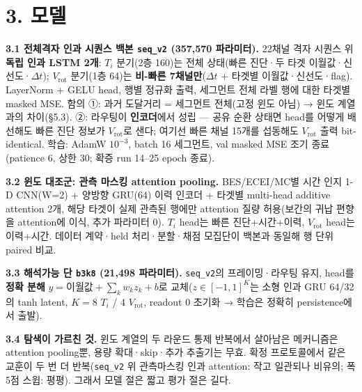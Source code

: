 \documentclass[10pt,a4paper]{article}
\newcommand{\Ti}{\ensuremath{T_i}}
\newcommand{\Vrot}{\ensuremath{V_\mathrm{rot}}}
\newcommand{\seqv}{\texttt{seq\_v2}}
\newcommand{\bthree}{\texttt{b3k8}}
\begin{document}
\section*{3. 모델}
\textbf{3.1 전체격자 인과 시퀀스 백본 \seqv{} (357,570 파라미터).} 22채널 격자 시퀀스 위 \textbf{독립 인과 LSTM 2개}: \Ti{} 분기(2층 160)는 전체 상태(빠른 진단·두 타겟 이월값·신선도·$\Delta t$); \Vrot{} 분기(1층 64)는 \textbf{비-빠른 7채널만}($\Delta t$ + 타겟별 이월값·신선도·flag). LayerNorm + GELU head, 행별 정규화 출력, 세그먼트 전체 라벨 행에 대한 타겟별 masked MSE. 함의 ①: 과거 도달거리 = 세그먼트 전체(고정 윈도 아님) → 윈도 계열과의 차이(\S5.3). ②: 라우팅이 \textbf{인코더}에서 성립 — 공유 순환 상태면 head를 어떻게 배선해도 빠른 진단 정보가 \Vrot{}로 샌다; 여기선 빠른 채널 15개를 섭동해도 \Vrot{} 출력 bit-identical. 학습: AdamW $10^{-3}$, batch 16 세그먼트, val masked MSE 조기 종료(patience 6, 상한 30; 확증 run 14–25 epoch 종료).

\textbf{3.2 윈도 대조군: 관측 마스킹 attention pooling.} BES/ECEI/MC별 시간 인지 1-D CNN(W=2) + 양방향 GRU(64) 이력 인코더 + 타겟별 multi-head additive attention 2개, 해당 타겟이 실제 관측된 행에만 attention 질량 허용(보간의 귀납 편향을 attention에 이식, 추가 파라미터 0). \Ti{} head는 빠른 진단+시간+이력, \Vrot{} head는 이력+시간. 데이터 계약·held 처리·분할·채점 모집단이 백본과 동일해 행 단위 paired 비교.

\textbf{3.3 해석가능 단 \bthree{} (21,498 파라미터).} \seqv{}의 프레이밍·라우팅 유지, head를 \textbf{정확 분해} $\hat y = \text{이월값} + \sum_k w_k z_k + b$로 교체($z\in[-1,1]^K$는 소형 인과 GRU 64/32의 tanh latent, $K=8$ \Ti{} / 4 \Vrot{}, readout 0 초기화 → 학습은 정확히 persistence에서 출발).

\textbf{3.4 탐색이 가르친 것.} 윈도 계열의 두 라운드 통제 반복에서 살아남은 메커니즘은 attention pooling뿐, 용량 확대·skip·추가 추출기는 무효. 확정 프로토콜에서 같은 교훈이 두 번 더 반복(\seqv{} 위 관측마스킹 인과 attention: 작고 일관되나 비유의; 폭 5점 스윕: 평평). 그래서 모델 절은 짧고 평가 절은 길다.
\end{document}
